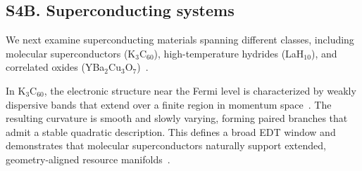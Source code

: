 \documentclass[12pt]{article}
\begin{document}

%
%
%


\subsection*{S4B. Superconducting systems}

We next examine superconducting materials spanning different classes, including molecular superconductors (K$_3$C$_{60}$), high-temperature hydrides (LaH$_{10}$), and correlated oxides (YBa$_2$Cu$_3$O$_7$)~\cite{Capone2009,Drozdov2015,Pickett1989}.

In K$_3$C$_{60}$, the electronic structure near the Fermi level is characterized by weakly dispersive bands that extend over a finite region in momentum space~\cite{Gunnarsson1997,Capone2009}. The resulting curvature is smooth and slowly varying, forming paired branches that admit a stable quadratic description. This defines a broad EDT window and demonstrates that molecular superconductors naturally support extended, geometry-aligned resource manifolds~\cite{Hu2025_APQ}.
\end{document}
